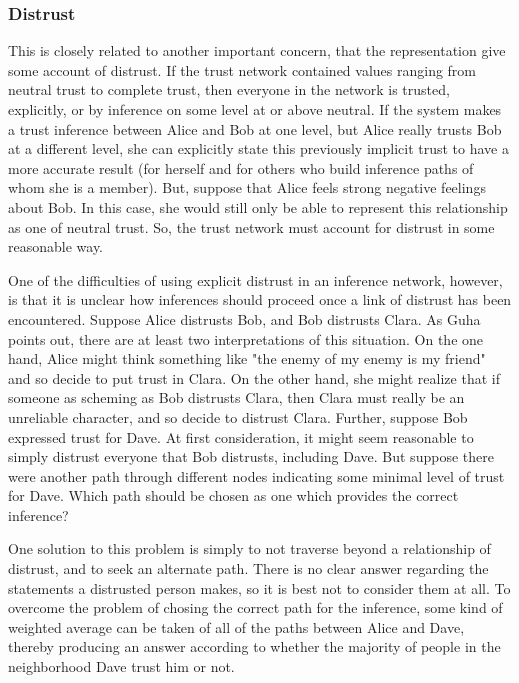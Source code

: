 \documentclass[onecolumn]{acm_proc_article-sp}
\begin{document}
\subsubsection{Distrust}
This is closely related to another important concern, that the representation give some account of distrust.  If the trust network contained values ranging from neutral trust to complete trust, then everyone in the network is trusted, explicitly, or by inference on some level at or above neutral.  If the system makes a trust inference between Alice and Bob at one level, but Alice really trusts Bob at a different level, she can explicitly state this previously implicit trust to have a more accurate result (for herself and for others who build inference paths of whom she is a member).  But, suppose that Alice feels strong negative feelings about Bob.  In this case, she would still only be able to represent this relationship as one of neutral trust.  So, the trust network must account for distrust in some reasonable way.

One of the difficulties of using explicit distrust in an inference network, however, is that it is unclear how inferences should proceed once a link of distrust has been encountered.  Suppose Alice distrusts Bob, and Bob distrusts Clara.  As Guha points out\cite{guha04propagation}, there are at least two interpretations of this situation.  On the one hand, Alice might think something like "the enemy of my enemy is my friend" and so decide to put trust in Clara.  On the other hand, she might realize that if someone as scheming as Bob distrusts Clara, then Clara must really be an unreliable character, and so decide to distrust Clara.  Further, suppose Bob expressed trust for Dave.  At first consideration, it might seem reasonable to simply distrust everyone that Bob distrusts, including Dave.  But suppose there were another path through different nodes indicating some minimal level of trust for Dave.  Which path should be chosen as one which provides the correct inference?

One solution to this problem is simply to not traverse beyond a relationship of distrust, and to seek an alternate path.  There is no clear answer regarding the statements a distrusted person makes, so it is best not to consider them at all.
To overcome the problem of chosing the correct path for the inference, some kind of weighted average can be taken of all of the paths between Alice and Dave, thereby producing an answer according to whether the majority of people in the neighborhood Dave trust him or not.
\end{document}

